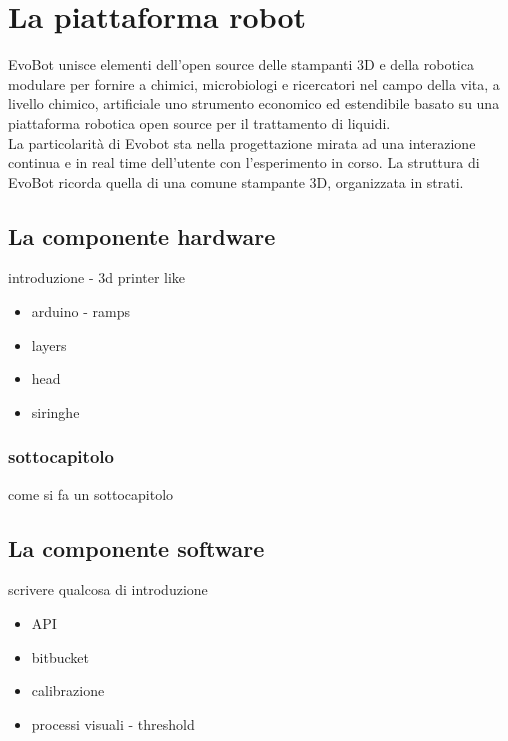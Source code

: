 \chapter{La piattaforma robot}
\vspace{0.5cm}

\label{cha:789}
EvoBot unisce elementi dell'open source delle stampanti 3D e della robotica modulare per fornire a chimici, microbiologi e ricercatori nel campo della vita, a livello chimico, artificiale uno strumento economico ed estendibile basato su una piattaforma robotica open source per il trattamento di liquidi.
\\ La particolarità di Evobot sta nella progettazione mirata ad una interazione continua e in real time dell'utente con l'esperimento in corso. \cite{introd-robot}
La struttura di EvoBot ricorda quella di una comune stampante 3D, organizzata in strati.


\section{La componente hardware}
\label{sec:456}
introduzione - 3d printer like
\begin{itemize}
  \item arduino - ramps
  \item layers 
  \item head
  \item siringhe
\end{itemize}


\subsection{sottocapitolo}
\label{sec:00456}
come si fa un sottocapitolo


\section{La componente software}
\label{sec:123}
scrivere qualcosa di introduzione
\begin{itemize}
  \item API 
  \item bitbucket
  \item calibrazione
  \item processi visuali - threshold 
\end{itemize}


